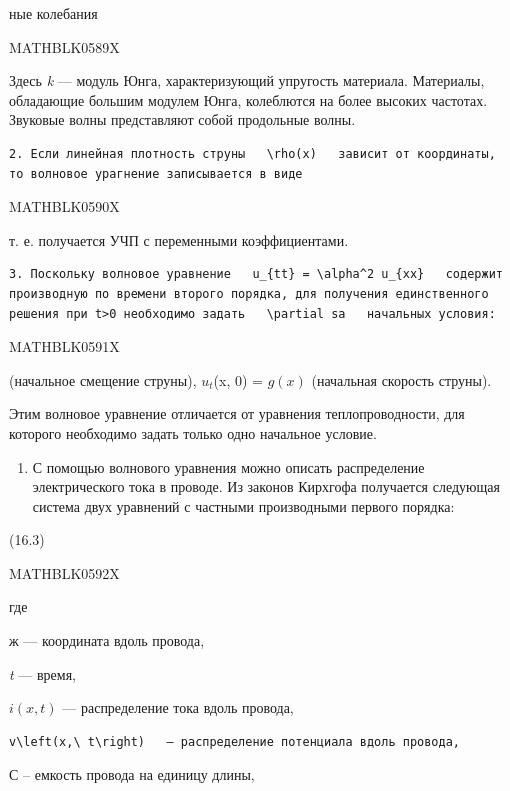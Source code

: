 \documentclass[
]{article}
\providecommand{\tightlist}{%
  \setlength{\itemsep}{0pt}\setlength{\parskip}{0pt}}
\begin{document}
ные колебания

MATHBLK0589X

Здесь \emph{k} --- модуль Юнга, характеризующий упругость материала.
Материалы, обладающие большим модулем Юнга, колеблются на более высоких
частотах. Звуковые волны представляют собой продольные волны.

\begin{verbatim}
2. Если линейная плотность струны   \rho(x)   зависит от координаты, то волновое урагнение записывается в виде
\end{verbatim}

MATHBLK0590X

т. е. получается УЧП с переменными коэффициентами.

\begin{verbatim}
3. Поскольку волновое уравнение   u_{tt} = \alpha^2 u_{xx}   содержит производную по времени второго порядка, для получения единственного решения при t>0 необходимо задать   \partial sa   начальных условия:
\end{verbatim}

MATHBLK0591X

(начальное смещение струны), \(u_t\)(x, 0) = \(g(x)\) (начальная
скорость струны).

Этим волновое уравнение отличается от уравнения теплопроводности, для
которого необходимо задать только одно начальное условие.

\begin{enumerate}
\def\labelenumi{\arabic{enumi}.}
\setcounter{enumi}{3}
\tightlist
\item
  С помощью волнового уравнения можно описать распределение
  электрического тока в проводе. Из законов Кирхгофа получается
  следующая система двух уравнений с частными производными первого
  порядка:
\end{enumerate}

(16.3)

MATHBLK0592X

где

ж --- координата вдоль провода,

\emph{t} --- время,

\(i(x, t)\) --- распределение тока вдоль провода,

\begin{verbatim}
v\left(x,\ t\right)   — распределение потенциала вдоль провода,
\end{verbatim}

С -- емкость провода на единицу длины,
\end{document}
